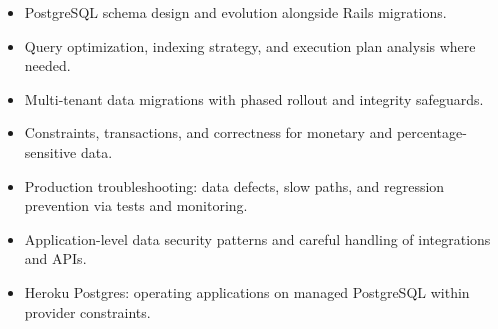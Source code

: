 
\begin{cvparagraph}
\begin{itemize}[leftmargin=2ex, nosep, noitemsep]
  \setlength{\parskip}{0pt}
  \renewcommand{\labelitemi}{\bullet}
  \item {PostgreSQL schema design and evolution alongside Rails migrations.}
  \item {Query optimization, indexing strategy, and execution plan analysis where needed.}
  \item {Multi-tenant data migrations with phased rollout and integrity safeguards.}
  \item {Constraints, transactions, and correctness for monetary and percentage-sensitive data.}
  \item {Production troubleshooting: data defects, slow paths, and regression prevention via tests and monitoring.}
  \item {Application-level data security patterns and careful handling of integrations and APIs.}
  \item {Heroku Postgres: operating applications on managed PostgreSQL within provider constraints.}
\end{itemize}
\end{cvparagraph}
